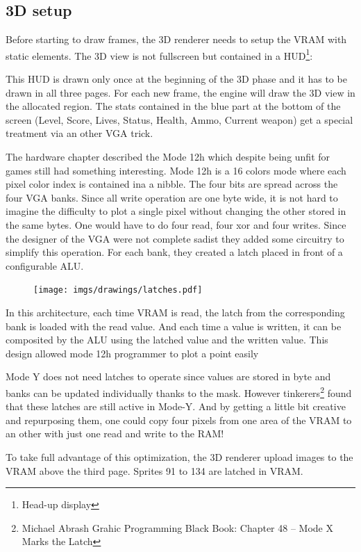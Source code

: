 \subsection{3D setup}
Before starting to draw frames, the 3D renderer needs to setup the VRAM with static elements. The 3D view is not fullscreen but contained in a HUD\footnote{Head-up display}:
\begin{figure}[H]
  \centering
\end{figure}
This HUD is drawn only once at the beginning of the 3D phase and it has to be drawn in all three pages. For each new frame, the engine will draw the 3D view in the allocated region. The stats contained in the blue part at the bottom of the screen (Level, Score, Lives, Status, Health, Ammo, Current weapon) get a special treatment via an other VGA trick.\\
\par

The hardware chapter described the Mode 12h which despite being unfit for games still had something interesting. Mode 12h is a 16 colors mode where each pixel color index is contained ina a nibble. The four bits are spread across the four VGA banks. Since all write operation are one byte wide, it is not hard to imagine the difficulty to plot a single pixel without changing the other stored in the same bytes. One would have to do four read, four xor and four writes. Since the designer of the VGA were not complete sadist they added some circuitry to simplify this operation. For each bank, they created a latch placed in front of a configurable ALU.\\
\par
 \begin{figure}[H]
\centering
 \texttt{[image: imgs/drawings/latches.pdf]}
 \end{figure}
In this architecture, each time VRAM is read, the latch from the corresponding bank is loaded with the read value. And each time a value is written, it can be composited by the ALU using the latched value and the written value. This design allowed mode 12h programmer to plot a point easily\\
\par
Mode Y does not need latches to operate since values are stored in byte and banks can be updated individually thanks to the mask. However tinkerers\footnote{Michael Abrash Grahic Programming Black Book: Chapter 48 -- Mode X Marks the Latch} found that these latches are still active in  Mode-Y. And by getting a little bit creative and repurposing them, one could copy four pixels from one area of the VRAM to an other with just one read and write to the RAM!\\
\par
To take full advantage of this optimization, the 3D renderer upload images to the VRAM above the third page. Sprites 91 to 134 are latched in VRAM.\\

